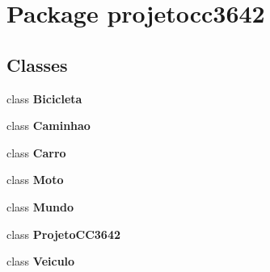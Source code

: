\section{Package projetocc3642}
\label{namespaceprojetocc3642}
\subsection*{Classes}
\begin{DoxyCompactItemize}
\item 
class \textbf{ Bicicleta}
\item 
class \textbf{ Caminhao}
\item 
class \textbf{ Carro}
\item 
class \textbf{ Moto}
\item 
class \textbf{ Mundo}
\item 
class \textbf{ Projeto\+C\+C3642}
\item 
class \textbf{ Veiculo}
\end{DoxyCompactItemize}
